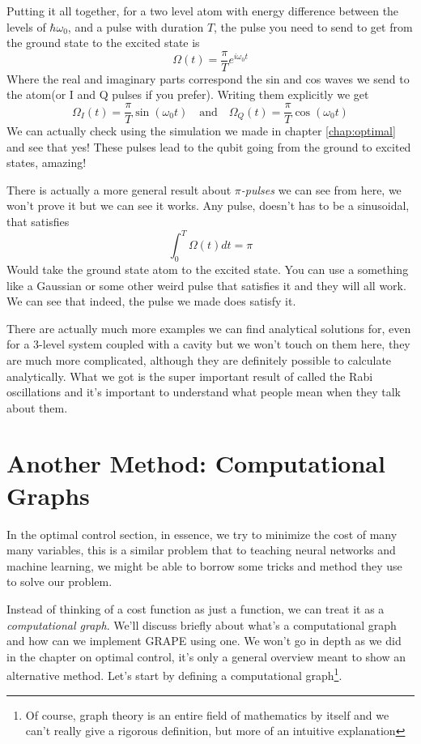 \documentclass[english, a4paper, 12pt, twoside]{article}
\numberwithin{equation}{section} %
\begin{document}
Putting it all together, for a two level atom with energy difference between the levels of $\hbar \omega_0$, and a pulse with duration $T$, the pulse you need to send to get from the ground state to the excited state is
\[
    \boxed{\Omega(t) = \frac{\pi}{T} e^{i \omega_0 t}}
\]
Where the real and imaginary parts correspond the sin and cos waves we send to the atom(or I and Q pulses if you prefer). Writing them explicitly we get
\[
    \boxed{\Omega_I (t) = \frac{\pi }{T} \sin (\omega_0 t)} \quad \text{and} \quad \boxed{\Omega_Q (t) = \frac{\pi}{T} \cos (\omega_0 t)}
\]
We can actually check using the simulation we made in chapter \ref{chap:optimal} and see that yes! These pulses lead to the qubit going from the ground to excited states, amazing!

There is actually a more general result about \textit{$\pi$-pulses} we can see from here, we won't prove it but we can see it works. Any pulse, doesn't has to be a sinusoidal, that satisfies
\[
    \int_0^T \Omega(t) dt = \pi
\]
Would take the ground state atom to the excited state. You can use a something like a Gaussian or some other weird pulse that satisfies it and they will all work. We can see that indeed, the pulse we made does satisfy it.

There are actually much more examples we can find analytical solutions for, even for a 3-level system coupled with a cavity but we won't touch on them here, they are much more complicated, although they are definitely possible to calculate analytically. What we got is the super important result of called the Rabi oscillations and it's important to understand what people mean when they talk about them.

\newpage
\section{Another Method: Computational Graphs}
In the optimal control section, in essence, we try to minimize the cost of many many variables, this is a similar problem that to teaching neural networks and machine learning, we might be able to borrow some tricks and method they use to solve our problem.

Instead of thinking of a cost function as just a function, we can treat it as a \textit{computational graph}. We'll discuss briefly about what's a computational graph and how can we implement GRAPE using one. We won't go in depth as we did in the chapter on optimal control, it's only a general overview meant to show an alternative method. Let's start by defining a computational graph\footnote{Of course, graph theory is an entire field of mathematics by itself and we can't really give a rigorous definition, but more of an intuitive explanation}.
\end{document}
